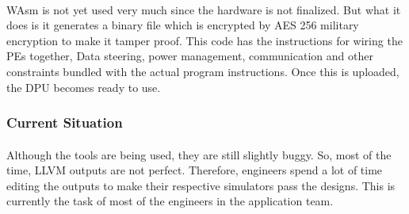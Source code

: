 \paragraph{}
WAsm is not yet used very much since the hardware is not finalized. But what it does is it generates a binary file which is encrypted by AES 256 military encryption to make it tamper proof. This code has the instructions for wiring the PEs together, Data steering, power management, communication and other constraints bundled with the actual program instructions. Once this is uploaded, the DPU becomes ready to use.

\subsubsection{Current Situation}
\paragraph{}
Although the tools are being used, they are still slightly buggy. So, most of the time, LLVM outputs are not perfect. Therefore, engineers spend a lot of time editing the outputs to make their respective simulators pass the designs. This is currently the task of most of the engineers in the application team.